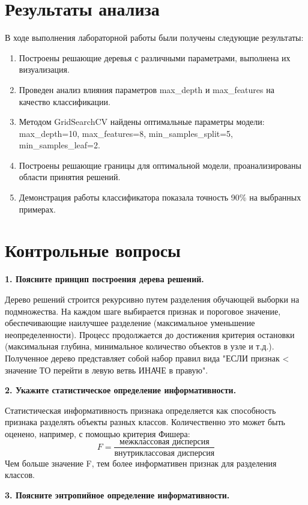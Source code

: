 \section{Результаты анализа}

В ходе выполнения лабораторной работы были получены следующие результаты:

\begin{enumerate}
    \item Построены решающие деревья с различными параметрами, выполнена их визуализация.
    \item Проведен анализ влияния параметров max\_depth и max\_features на качество классификации.
    \item Методом GridSearchCV найдены оптимальные параметры модели: max\_depth=10, max\_features=8, min\_samples\_split=5, min\_samples\_leaf=2.
    \item Построены решающие границы для оптимальной модели, проанализированы области принятия решений.
    \item Демонстрация работы классификатора показала точность 90\% на выбранных примерах.
\end{enumerate}

\newpage
\section{Контрольные вопросы}

\textbf{1. Поясните принцип построения дерева решений.}

Дерево решений строится рекурсивно путем разделения обучающей выборки на подмножества. На каждом шаге выбирается признак и пороговое значение, обеспечивающие наилучшее разделение (максимальное уменьшение неопределенности). Процесс продолжается до достижения критерия остановки (максимальная глубина, минимальное количество объектов в узле и т.д.). Полученное дерево представляет собой набор правил вида "ЕСЛИ признак < значение ТО перейти в левую ветвь ИНАЧЕ в правую".

\textbf{2. Укажите статистическое определение информативности.}

Статистическая информативность признака определяется как способность признака разделять объекты разных классов. Количественно это может быть оценено, например, с помощью критерия Фишера:
\[
F = \frac{\text{межклассовая дисперсия}}{\text{внутриклассовая дисперсия}}
\]
Чем больше значение F, тем более информативен признак для разделения классов.

\textbf{3. Поясните энтропийное определение информативности.}

